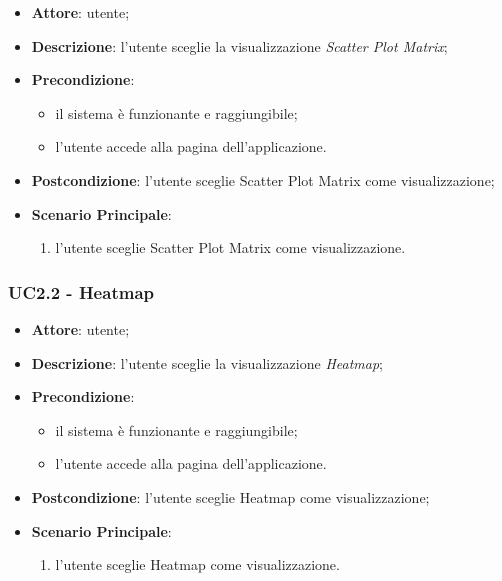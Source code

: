     \begin{itemize}
    \item \textbf{Attore}: utente;
    \item \textbf{Descrizione}: l'utente sceglie la visualizzazione \emph{Scatter Plot Matrix};
    \item \textbf{Precondizione}:
    \begin{itemize}
        \item il sistema è funzionante e raggiungibile;
        \item l'utente accede alla pagina dell'applicazione.
    \end{itemize}
    \item \textbf{Postcondizione}: l'utente sceglie Scatter Plot Matrix come visualizzazione;
    \item \textbf{Scenario Principale}: 
        \begin{enumerate}
            \item l'utente sceglie Scatter Plot Matrix come visualizzazione.
        \end{enumerate}
    \end{itemize}
    
    \subsubsection{UC2.2 - Heatmap}
    \label{uc2.2}
    
    \begin{itemize}
    \item \textbf{Attore}: utente;
    \item \textbf{Descrizione}: l'utente sceglie la visualizzazione \emph{Heatmap};
    \item \textbf{Precondizione}:
    \begin{itemize}
        \item il sistema è funzionante e raggiungibile;
        \item l'utente accede alla pagina dell'applicazione.
    \end{itemize}
    \item \textbf{Postcondizione}: l'utente sceglie Heatmap come visualizzazione;
    \item \textbf{Scenario Principale}: 
        \begin{enumerate}
            \item l'utente sceglie Heatmap come visualizzazione.
        \end{enumerate}
    \end{itemize}
    
